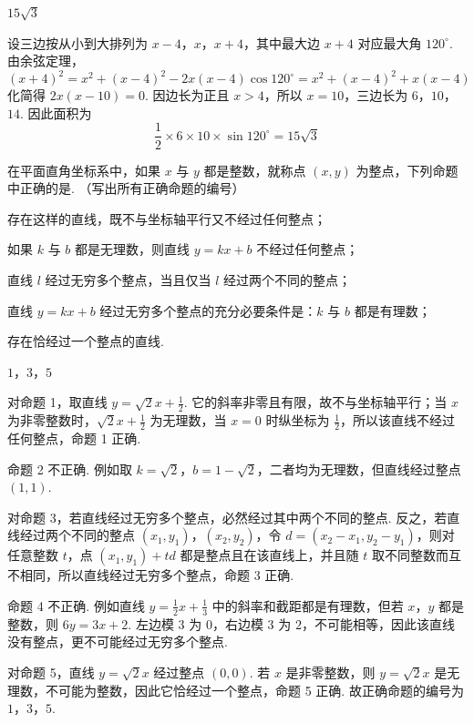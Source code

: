 \begin{answer}
\(15\sqrt{3}\)
\end{answer}

\begin{solution}
设三边按从小到大排列为 \(x-4\)，\(x\)，\(x+4\)，其中最大边 \(x+4\) 对应最大角 \(120^{\circ}\). 由余弦定理，
\[
(x+4)^2=x^2+(x-4)^2-2x(x-4)\cos120^{\circ}=x^2+(x-4)^2+x(x-4)
\]
化简得 \(2x(x-10)=0\). 因边长为正且 \(x>4\)，所以 \(x=10\)，三边长为 \(6\)，\(10\)，\(14\). 因此面积为
\[
\frac12\times6\times10\times\sin120^{\circ}=15\sqrt3
\]
\end{solution}

\begin{problem}
在平面直角坐标系中，如果 \(x\) 与 \(y\) 都是整数，就称点 \((x, y)\) 为整点，下列命题中正确的是\fillinblank{}. （写出所有正确命题的编号）

\begin{circlelist}
\item 存在这样的直线，既不与坐标轴平行又不经过任何整点；
\item 如果 \(k\) 与 \(b\) 都是无理数，则直线 \(y = kx + b\) 不经过任何整点；
\item 直线 \(l\) 经过无穷多个整点，当且仅当 \(l\) 经过两个不同的整点；
\item 直线 \(y = kx + b\) 经过无穷多个整点的充分必要条件是：\(k\) 与 \(b\) 都是有理数；
\item 存在恰经过一个整点的直线.
\end{circlelist}
\end{problem}

\begin{answer}
\(1\)，\(3\)，\(5\)
\end{answer}

\begin{solution}
对命题 1，取直线 \(y=\sqrt2x+\frac12\). 它的斜率非零且有限，故不与坐标轴平行；当 \(x\) 为非零整数时，\(\sqrt2x+\frac12\) 为无理数，当 \(x=0\) 时纵坐标为 \(\frac12\)，所以该直线不经过任何整点，命题 1 正确.

命题 2 不正确. 例如取 \(k=\sqrt2\)，\(b=1-\sqrt2\)，二者均为无理数，但直线经过整点 \((1,1)\).

对命题 3，若直线经过无穷多个整点，必然经过其中两个不同的整点. 反之，若直线经过两个不同的整点 \((x_1,y_1)\)，\((x_2,y_2)\)，令 \(d=(x_2-x_1,y_2-y_1)\)，则对任意整数 \(t\)，点 \((x_1,y_1)+td\) 都是整点且在该直线上，并且随 \(t\) 取不同整数而互不相同，所以直线经过无穷多个整点，命题 3 正确.

命题 4 不正确. 例如直线 \(y=\frac12x+\frac13\) 中的斜率和截距都是有理数，但若 \(x\)，\(y\) 都是整数，则 \(6y=3x+2\). 左边模 \(3\) 为 \(0\)，右边模 \(3\) 为 \(2\)，不可能相等，因此该直线没有整点，更不可能经过无穷多个整点.

对命题 5，直线 \(y=\sqrt2x\) 经过整点 \((0,0)\). 若 \(x\) 是非零整数，则 \(y=\sqrt2x\) 是无理数，不可能为整数，因此它恰经过一个整点，命题 5 正确. 故正确命题的编号为 \(1\)，\(3\)，\(5\).
\end{solution}

